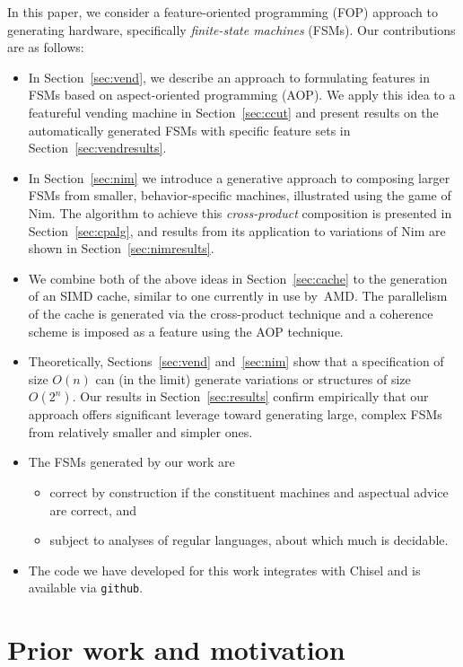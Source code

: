 \documentclass[sigplan,anonymous,review]{acmart}
\begin{document}
In this paper, we consider a feature-oriented programming (FOP) approach to generating hardware, specifically \emph{finite-state machines} (FSMs).   Our contributions are as follows:
\begin{itemize}
    \item In Section~\ref{sec:vend}, we describe an approach to formulating features in FSMs based on aspect-oriented programming (AOP).  We apply this idea to a featureful vending machine in Section~\ref{sec:ccut} and present results on the automatically generated FSMs with specific feature sets in Section~\ref{sec:vendresults}.
    \item In Section~\ref{sec:nim} we introduce a generative approach to composing larger FSMs from smaller, behavior-specific machines, illustrated using the game of Nim.  The algorithm to achieve this \emph{cross-product} composition is presented in Section~\ref{sec:cpalg}, and results from its application to variations of Nim are shown in Section~\ref{sec:nimresults}.
    \item We combine both of the above ideas in Section~\ref{sec:cache} to the generation of an SIMD cache, similar to one currently in use by~AMD.  The parallelism of the cache is generated via the cross-product technique and a coherence scheme is imposed as a feature using the AOP technique.
    \item Theoretically, Sections~\ref{sec:vend} and~\ref{sec:nim} show that a specification of size $O(n)$ can (in the limit) generate variations or structures of size~$O(2^{n})$.  Our results in Section~\ref{sec:results} confirm empirically that our approach offers significant leverage toward generating large, complex FSMs from relatively smaller and simpler ones. 
    \item The FSMs generated by our work are
    \begin{itemize}
        \item correct by construction if the constituent machines and aspectual advice are correct, and
        \item subject to analyses of regular languages, about which much is decidable. 
    \end{itemize}
    \item The code we have developed for this work integrates with Chisel and is available via \texttt{github}.
\end{itemize}


\section{Prior work and motivation}\label{sec:prior}
\end{document}
